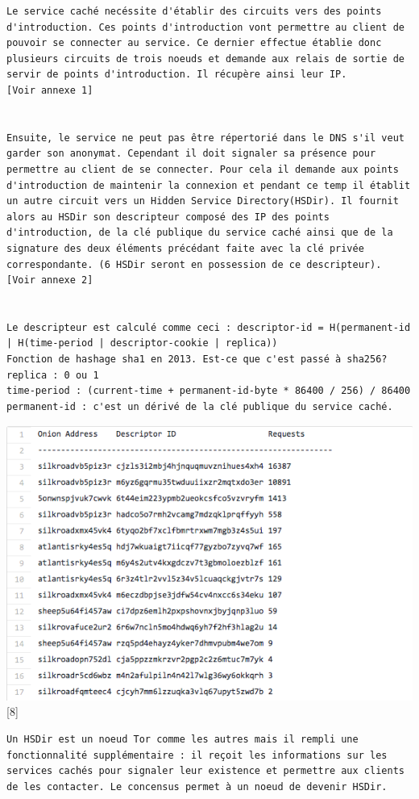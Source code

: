 \documentclass[]{article}
\begin{document}
\begin{verbatim}
Le service caché necéssite d'établir des circuits vers des points d'introduction. Ces points d'introduction vont permettre au client de pouvoir se connecter au service. Ce dernier effectue établie donc plusieurs circuits de trois noeuds et demande aux relais de sortie de servir de points d'introduction. Il récupère ainsi leur IP.
[Voir annexe 1]


Ensuite, le service ne peut pas être répertorié dans le DNS s'il veut garder son anonymat. Cependant il doit signaler sa présence pour permettre au client de se connecter. Pour cela il demande aux points d'introduction de maintenir la connexion et pendant ce temp il établit un autre circuit vers un Hidden Service Directory(HSDir). Il fournit alors au HSDir son descripteur composé des IP des points d'introduction, de la clé publique du service caché ainsi que de la signature des deux éléments précédant faite avec la clé privée correspondante. (6 HSDir seront en possession de ce descripteur).
[Voir annexe 2]


Le descripteur est calculé comme ceci : descriptor-id = H(permanent-id | H(time-period | descriptor-cookie | replica))
Fonction de hashage sha1 en 2013. Est-ce que c'est passé à sha256?
replica : 0 ou 1
time-period : (current-time + permanent-id-byte * 86400 / 256) / 86400
permanent-id : c'est un dérivé de la clé publique du service caché.
\end{verbatim}

\includegraphics{images/HSDir.png}{[}8{]}

\begin{verbatim}
Un HSDir est un noeud Tor comme les autres mais il rempli une fonctionnalité supplémentaire : il reçoit les informations sur les services cachés pour signaler leur existence et permettre aux clients de les contacter. Le concensus permet à un noeud de devenir HSDir.
\end{verbatim}
\end{document}
